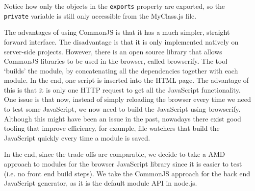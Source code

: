 Notice how only the objects in the \lstinline{exports} property are exported, so the \lstinline{private} variable is still only accessible from the MyClass.js file.

The advantages of using CommonJS is that it has a much simpler, straight forward interface. The disadvantage is that it is only implemented natively on server-side projects. However, there is an open source library that allows CommonJS libraries to be used in the browser, called browserify. The tool `builds' the module, by concatenating all the dependencies together with each module. In the end, one script is inserted into the HTML page. The advantage of this is that it is only one HTTP request to get all the JavaScript functionality. One issue is that now, instead of simply reloading the browser every time we need to test some JavaScript, we now need to build the JavaScript using browserify. Although this might have been an issue in the past, nowadays there exist good tooling that improve efficiency, for example, file watchers that build the JavaScript quickly every time a module is saved.


In the end, since the trade offs are comparable, we decide to take a AMD approach to modules for the browser JavaScript library since it is easier to test (i.e. no front end build steps). We take the CommonJS approach for the back end JavaScript generator, as it is the default module API in node.js.


